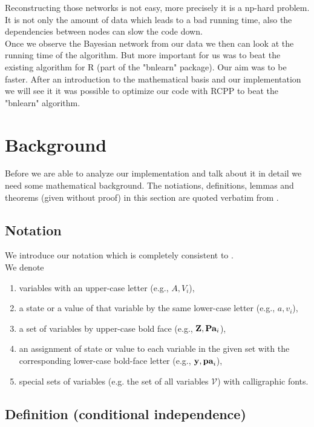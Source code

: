 Reconstructing those networks is not easy, more precisely it is a np-hard problem. It is not only the amount of data which leads to a bad running time, also the dependencies between nodes can slow the code down.\\

Once we observe the Bayesian network from our data we then can look at the running time of the algorithm. But more important for us was to beat the existing algorithm for R (part of the "bnlearn" package). Our aim was to be faster. After an introduction to the mathematical basis and our implementation we will see it it was possible to optimize our code with RCPP to beat the "bnlearn" algorithm.

\chapter{Background}

	Before we are able to analyze our implementation and talk about it in detail we need some mathematical background. The notiations, definitions, lemmas and theorems (given without proof) in this section are quoted verbatim from \cite{TBA}.

	\section*{Notation}

		We introduce our notation which is completely consistent to \cite{TBA}.\\
		We denote
		\begin{enumerate}
			\item variables with an upper-case letter (e.g., $A, V_{i}$),
			\item a state or a value of that variable by the same lower-case letter (e.g., $a, v_{i}$),
			\item a set of variables by upper-case bold face (e.g., ${\textbf{Z}}, {\textbf{Pa}}_{i}$),
			\item an assignment of state or value to each variable in the given set with the corresponding lower-case bold-face letter (e.g., ${\textbf{y}}, {\textbf{pa}}_{i}$),
			\item special sets of variables (e.g. the set of all variables $\mathcal{V}$) with calligraphic fonts.
		\end{enumerate}

	\section*{Definition (conditional independence)} \label{s.Def1}
	
